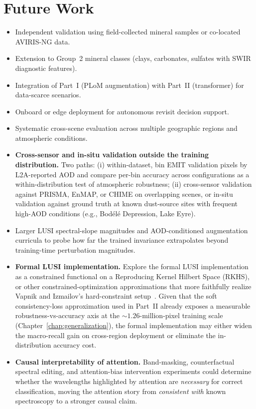 \documentclass[11pt]{report}
\begin{document}
\section{Future Work}

\begin{itemize}
  \item Independent validation using field-collected mineral samples or co-located AVIRIS-NG data.
  \item Extension to Group~2 mineral classes (clays, carbonates, sulfates with SWIR diagnostic features).
  \item Integration of Part~I (PLoM augmentation) with Part~II (transformer) for data-scarce scenarios.
  \item Onboard or edge deployment for autonomous revisit decision support.
  \item Systematic cross-scene evaluation across multiple geographic regions and atmospheric conditions.
  \item \textbf{Cross-sensor and in-situ validation outside the training distribution.} Two paths: (i) within-dataset, bin EMIT validation pixels by L2A-reported AOD and compare per-bin accuracy across configurations as a within-distribution test of atmospheric robustness; (ii) cross-sensor validation against PRISMA, EnMAP, or CHIME on overlapping scenes, or in-situ validation against ground truth at known dust-source sites with frequent high-AOD conditions (e.g., Bod\'el\'e Depression, Lake Eyre).
  \item Larger LUSI spectral-slope magnitudes and AOD-conditioned augmentation curricula to probe how far the trained invariance extrapolates beyond training-time perturbation magnitudes.
  \item \textbf{Formal LUSI implementation.} Explore the formal LUSI implementation as a constrained functional on a Reproducing Kernel Hilbert Space (RKHS), or other constrained-optimization approximations that more faithfully realize Vapnik and Izmailov's hard-constraint setup~\cite{vapnik2020}. Given that the soft consistency-loss approximation used in Part~II already exposes a measurable robustness-vs-accuracy axis at the $\sim$$1.26$-million-pixel training scale (Chapter~\ref{chap:generalization}), the formal implementation may either widen the macro-recall gain on cross-region deployment or eliminate the in-distribution accuracy cost.
  \item \textbf{Causal interpretability of attention.} Band-masking, counterfactual spectral editing, and attention-bias intervention experiments could determine whether the wavelengths highlighted by attention are \emph{necessary} for correct classification, moving the attention story from \emph{consistent with} known spectroscopy to a stronger causal claim.
$$
\end{itemize}
\end{document}
